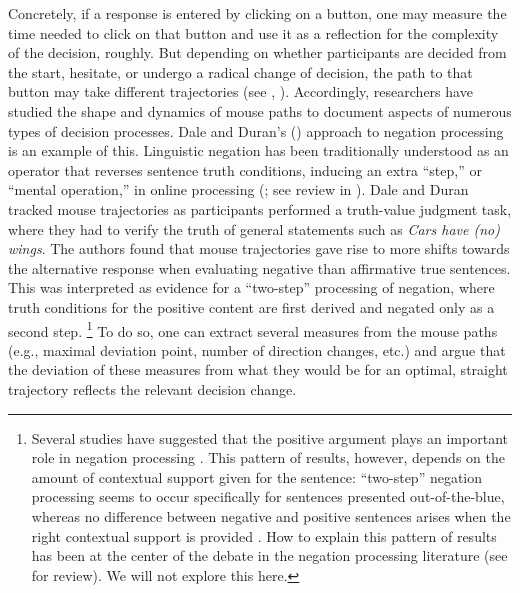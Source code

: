 \documentclass[11pt]{article}
\newcommand{\changeEC}[2]{{\footnotesize\textcolor{gray}{#1}}\textcolor{blue}{#2}}
\begin{document}
Concretely, if a response is entered by clicking on a button, one may measure the time needed to click on that button and use it as a reflection for the complexity of the decision, roughly. But depending on whether participants are decided from the start, hesitate, or undergo a radical change of decision, the path to that button may take different trajectories (see , \citealp{Wojnowicz2009}). %
Accordingly, researchers have studied the shape and dynamics of mouse paths to document aspects of numerous types of decision processes. Dale and Duran's (\citeyear{Dale2011}) approach to negation processing is an example of this.   
Linguistic negation has been traditionally understood as an operator that reverses sentence truth conditions, inducing an extra ``step,'' or ``mental operation,'' in online processing (\citealp{wason1965contexts,wason1972psychology}; see review in \citealp{Tian2016}). %
Dale and Duran tracked mouse trajectories as participants performed a truth-value judgment task, where they had to verify the truth of general statements such as \textit{Cars have (no) wings}.
%
The authors found that mouse trajectories gave rise to more shifts towards the alternative response when evaluating negative than affirmative true sentences. This was interpreted as evidence for a ``two-step'' processing of negation, where truth conditions for the positive content are first derived and negated only as a second step.%
%
\footnote{Several studies have suggested that the positive argument plays an important role in negation processing \citep[among others]{kaup2007experiential,ludtke2008event}.  
This pattern of results, however, depends on the amount of contextual support given for the sentence: ``two-step'' negation processing seems to occur specifically for sentences presented out-of-the-blue, whereas no difference between negative and positive sentences arises when the right contextual support is provided \citep{nieuwland2008truth,tian2010we}. How to explain this pattern of results has been at the center of the debate in the negation processing literature (see \citealp{Tian2016} for review). We will not explore this here.}
To do so, one can extract several measures from the mouse paths (e.g., maximal deviation point, number of direction changes, etc.) and argue that the deviation of these measures from what they would be for an optimal, straight trajectory reflects the relevant decision change.

\end{document}
